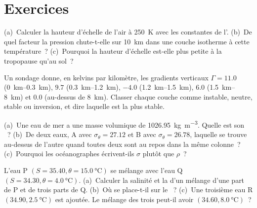 \section{Exercices}

\begin{exercise}[$\star$]\label{exo:b1:fluid-envelopes-structure:1}
(a)~Calculer la hauteur d'échelle de l'air à \qty{250}{K} avec les constantes de
l'. (b)~De quel facteur la pression chute-t-elle sur \qty{10}{km}
dans une couche isotherme à cette température~? (c)~Pourquoi la hauteur d'échelle est-elle plus petite
à la tropopause qu'au sol~?
\end{exercise}

\begin{exercise}[$\star$]\label{exo:b1:fluid-envelopes-structure:2}
Un sondage donne, en kelvins par kilomètre, les gradients verticaux $\Gamma = 11.0$
(\qtyrange{0}{0.3}{km}), $9.7$ (\qtyrange{0.3}{1.2}{km}), $-4.0$
(\qtyrange{1.2}{1.5}{km}), $6.0$ (\qtyrange{1.5}{8}{km}) et $0.0$ (au-dessus de
\qty{8}{km}). Classer chaque couche comme instable, neutre, stable ou inversion,
et dire laquelle est la plus stable.
\end{exercise}

\begin{exercise}[$\star$]\label{exo:b1:fluid-envelopes-structure:3}
(a)~Une eau de mer a une masse volumique de \qty{1026.95}{kg.m^{-3}}. Quelle est son ~? (b)~De deux eaux, A avec $\sigma_\theta = 27.12$ et B avec
$\sigma_\theta = 26.78$, laquelle se trouve au-dessus de l'autre quand toutes deux sont au repos dans la
même colonne~? (c)~Pourquoi les océanographes écrivent-ils $\sigma$ plutôt que $\rho$~?
\end{exercise}

\begin{exercise}[$\star$]\label{exo:b1:fluid-envelopes-structure:4}
L'eau P $(S = 35.40, \theta = \qty{15.0}{\celsius})$ se mélange avec l'eau Q $(S =
34.30, \theta = \qty{4.0}{\celsius})$. (a)~Calculer la salinité et la
 d'un mélange d'une part de P et de trois parts de Q.
(b)~Où se place-t-il sur le ~? (c)~Une troisième eau R $(34.90,
\qty{2.5}{\celsius})$ est ajoutée. Le mélange des trois peut-il avoir
$(34.60, \qty{8.0}{\celsius})$~?
\end{exercise}

